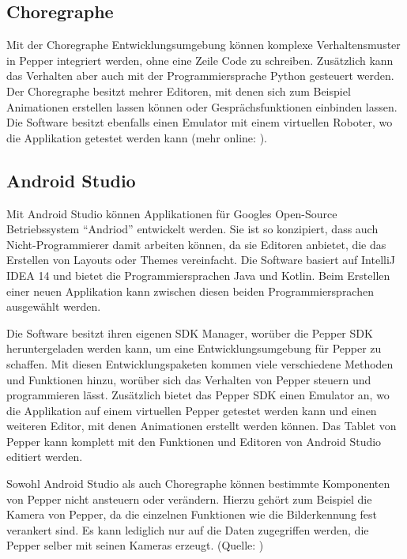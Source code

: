 \subsection{Choregraphe}

Mit der Choregraphe Entwicklungsumgebung können komplexe Verhaltensmuster in Pepper integriert werden, ohne eine Zeile Code zu schreiben. Zusätzlich kann das Verhalten aber auch mit der Programmiersprache Python gesteuert werden. Der Choregraphe besitzt mehrer Editoren, mit denen sich zum Beispiel Animationen erstellen lassen können oder Gesprächsfunktionen einbinden lassen. Die Software besitzt ebenfalls einen Emulator mit einem virtuellen Roboter, wo die Applikation getestet werden kann (mehr online: \cite{Choregraphe}).\\

\subsection{Android Studio}

Mit Android Studio können Applikationen für Googles Open-Source Betriebssystem ``Andriod'' entwickelt werden. Sie ist so konzipiert, dass auch Nicht-Programmierer damit arbeiten können, da sie Editoren anbietet, die das Erstellen von Layouts oder Themes vereinfacht. Die Software basiert auf IntelliJ IDEA 14 und bietet die Programmiersprachen Java und Kotlin. Beim Erstellen einer neuen Applikation kann zwischen diesen beiden Programmiersprachen ausgewählt werden.

Die Software besitzt ihren eigenen SDK Manager, worüber die Pepper SDK heruntergeladen werden kann, um eine Entwicklungsumgebung für Pepper zu schaffen. Mit diesen Entwicklungspaketen kommen viele verschiedene Methoden und Funktionen hinzu, worüber sich das Verhalten von Pepper steuern und programmieren lässt. Zusätzlich bietet das Pepper SDK einen Emulator an, wo die Applikation auf einem virtuellen Pepper getestet werden kann und einen weiteren Editor, mit denen Animationen erstellt werden können. Das Tablet von Pepper kann komplett mit den Funktionen und Editoren von Android Studio editiert werden.

Sowohl Android Studio als auch Choregraphe können bestimmte Komponenten von Pepper nicht ansteuern oder verändern. Hierzu gehört zum Beispiel die Kamera von Pepper, da die einzelnen Funktionen wie die Bilderkennung fest verankert sind. Es kann lediglich nur auf die Daten zugegriffen werden, die Pepper selber mit seinen Kameras erzeugt.
(Quelle: \cite{Android_Studio})\\

